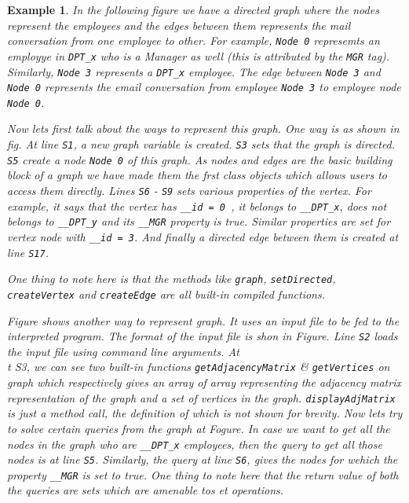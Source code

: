 \documentclass[letterpaper]{sig-alternate} \special{papersize=8.5in,11in}
\newtheorem{example}{Example}
\begin{document}
\begin{example}{\rm
In the following figure we have a directed graph where the nodes represent the employees
and the edges between them represents the mail conversation from one employee to 
other. For example, {\tt Node 0} represemts an employye in {\tt DPT\_x} who is a 
Manager as well (this is attributed by the {\tt MGR} tag). Similarly, {\tt Node 
3} represents a {\tt DPT\_x} employee. The edge between {\tt Node 3} and {\tt 
Node 0} represents the email conversation from employee {\tt Node 3} to 
  employee node {\tt Node 0}.

  Now lets first talk about the ways to represent this graph. One way is as 
  shown in fig. At line {\tt S1}, a new graph variable is created. {\tt S3} sets that
  the graph is directed. {\tt S5} create a node {\tt Node 0} of this graph. As nodes 
  and edges are the basic building block of a graph we have made them the frst 
  class objects which allows users to access them directly. Lines {\tt S6} - 
  {\tt S9} sets various properties of the vertex. For example, it says that the 
vertex has {\tt \_\_id = 0 }, it belongs to  {\tt \_\_DPT\_x}, does not belongs 
  to {\tt \_\_DPT\_y} and its {\tt \_\_MGR} property is true. Similar properties 
  are set for vertex node with {\tt \_\_id = 3}.
  And finally a directed  edge between them is created at line {\tt S17}. 

  One thing to note here is that the methods 
  like {\tt graph}, {\tt setDirected}, {\tt createVertex} and {\tt createEdge} 
are all built-in compiled functions. 

  Figure shows another way to represent graph. It uses an input file to be fed to
  the interpreted program. The format of the input file is shon in Figure.
  Line {\tt S2} loads the input file using command line arguments. At {\\t S3}, we can 
  see two built-in functions {\tt getAdjacencyMatrix} \& {\tt getVertices} on graph
  which respectively gives an array of array representing the adjacency matrix representation of the 
  graph and a set of vertices in the graph. {\tt displayAdjMatrix} is just a method call, the definition of 
  which is not shown for brevity. Now lets try to solve certain queries from the graph at Fogure.
  In case we want to get all the nodes in the graph who are {\tt \_\_DPT\_x} employees, then
  the query to get all those nodes is at line {\tt S5}. Similarly, the query at line {\tt S6}, gives
  the nodes for wehich the property {\tt \_\_MGR} is set to true. 
  One thing to note here that the return value of both the queries are sets which are amenable tos et operations.

}
\end{example}
\end{document}
